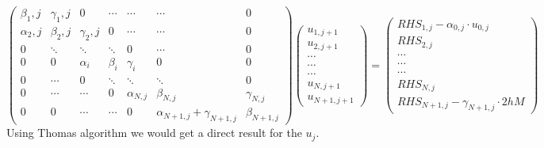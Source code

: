 \documentclass[11pt, a4paper]{article}
\begin{document}
\begin{equation}
    \begin{pmatrix}
        \beta_1,j & \gamma_1,j & 0 & \cdots & \cdots & \cdots & 0 \\
        \alpha_2,j & \beta_2,j & \gamma_2,j & 0 & \cdots & \cdots & 0 \\
        0 & \ddots & \ddots & \ddots & 0 & \cdots & 0 \\
        0 & 0 & \alpha_i & \beta_i & \gamma_i & 0 & 0 \\
        0 & \cdots & 0 & \ddots & \ddots & \ddots & 0 \\
        0 & \cdots & \cdots & 0 & \alpha_{N,j} & \beta_{N,j} & \gamma_{N,j} \\
        0 & 0 & \cdots & \cdots & 0 & \alpha_{N+1,j}+\gamma_{N+1,j} &\beta_{N+1,j}
    \end{pmatrix}
    \begin{pmatrix}
        u_{1,j+1} \\
        u_{2,j+1} \\
        \cdots \\
        \cdots \\
        \cdots \\
        u_{N,j+1} \\
        u_{N+1,j+1}
    \end{pmatrix}
    =
    \begin{pmatrix}
        RHS_{1,j}-\alpha_{0,j}\cdot u_{0,j} \\
        RHS_{2,j} \\
        \cdots \\
        \cdots \\
        \cdots \\
        RHS_{N,j} \\
        RHS_{N+1,j}-\gamma_{N+1,j}\cdot2hM
    \end{pmatrix}
\end{equation}
Using Thomas algorithm we would get a direct result for the $u_j$.
\end{document}
